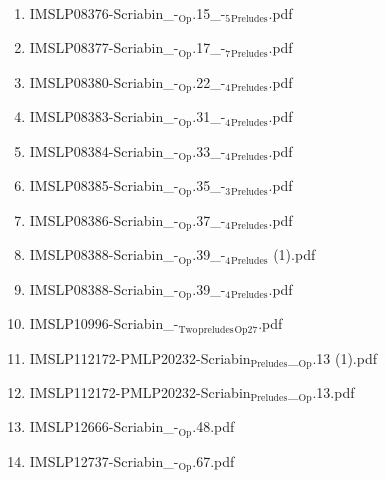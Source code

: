 \documentclass[11pt]{article}
\begin{document}
\begin{enumerate}
\begin{enumerate}
\item IMSLP08376-Scriabin\_-$_{\text{Op}}$.15\_-$_{\text{5}}$$_{\text{Preludes}}$.pdf
\label{sec-1-1-1-1-44-63-13-2}

\item IMSLP08377-Scriabin\_-$_{\text{Op}}$.17\_-$_{\text{7}}$$_{\text{Preludes}}$.pdf
\label{sec-1-1-1-1-44-63-13-3}

\item IMSLP08380-Scriabin\_-$_{\text{Op}}$.22\_-$_{\text{4}}$$_{\text{Preludes}}$.pdf
\label{sec-1-1-1-1-44-63-13-4}

\item IMSLP08383-Scriabin\_-$_{\text{Op}}$.31\_-$_{\text{4}}$$_{\text{Preludes}}$.pdf
\label{sec-1-1-1-1-44-63-13-5}

\item IMSLP08384-Scriabin\_-$_{\text{Op}}$.33\_-$_{\text{4}}$$_{\text{Preludes}}$.pdf
\label{sec-1-1-1-1-44-63-13-6}

\item IMSLP08385-Scriabin\_-$_{\text{Op}}$.35\_-$_{\text{3}}$$_{\text{Preludes}}$.pdf
\label{sec-1-1-1-1-44-63-13-7}

\item IMSLP08386-Scriabin\_-$_{\text{Op}}$.37\_-$_{\text{4}}$$_{\text{Preludes}}$.pdf
\label{sec-1-1-1-1-44-63-13-8}

\item IMSLP08388-Scriabin\_-$_{\text{Op}}$.39\_-$_{\text{4}}$$_{\text{Preludes}}$ (1).pdf
\label{sec-1-1-1-1-44-63-13-9}

\item IMSLP08388-Scriabin\_-$_{\text{Op}}$.39\_-$_{\text{4}}$$_{\text{Preludes}}$.pdf
\label{sec-1-1-1-1-44-63-13-10}

\item IMSLP10996-Scriabin\_-$_{\text{Two}}$$_{\text{preludes}}$$_{\text{Op27}}$.pdf
\label{sec-1-1-1-1-44-63-13-11}

\item IMSLP112172-PMLP20232-Scriabin$_{\text{Preludes}}$\_$_{\text{Op}}$.13 (1).pdf
\label{sec-1-1-1-1-44-63-13-12}

\item IMSLP112172-PMLP20232-Scriabin$_{\text{Preludes}}$\_$_{\text{Op}}$.13.pdf
\label{sec-1-1-1-1-44-63-13-13}

\item IMSLP12666-Scriabin\_-$_{\text{Op}}$.48.pdf
\label{sec-1-1-1-1-44-63-13-14}

\item IMSLP12737-Scriabin\_-$_{\text{Op}}$.67.pdf
\label{sec-1-1-1-1-44-63-13-15}


\end{enumerate}
\end{enumerate}
\end{document}
